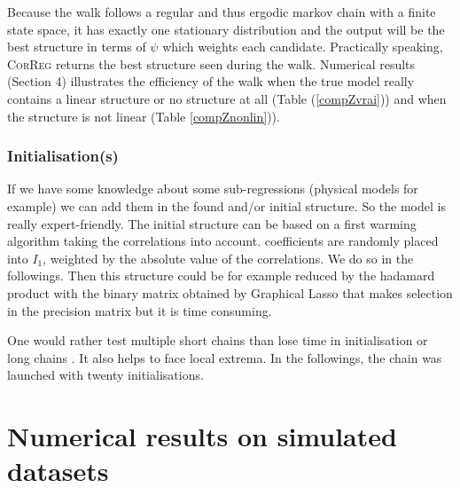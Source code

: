 \documentclass[11pt,a4paper]{article}
\begin{document}
Because the walk follows a regular and thus ergodic markov chain with a finite state space, it has exactly one stationary distribution \cite{grinstead1997introduction} %
%	
%	
%		
and the output will be the best structure in terms of $\psi$ which weights each candidate. Practically speaking, \textsc{CorReg} returns the best structure seen during the walk.
Numerical results (Section 4) illustrates the efficiency of the walk when the true model really contains a linear structure or no structure at all (Table (\ref{compZvrai})) and when the structure is not linear (Table \ref{compZnonlin})).

 \subsubsection{Initialisation(s)}

 If we have some knowledge about some sub-regressions (physical models for example) we can add them in the found and/or initial structure. So the model is really expert-friendly.
The initial structure can be based on a first warming algorithm taking the correlations into account. coefficients are randomly placed into $I_1$, weighted by the absolute value of the correlations. We do so in the followings. Then this structure could be for example reduced by the hadamard product with the binary matrix obtained by Graphical Lasso\cite{friedman2008sparse} that makes selection in the precision matrix but it is time consuming.

	One would rather test multiple short chains than lose time in initialisation or long chains \cite{gilks1996markov}. It also helps to face local extrema. In the followings, the chain was launched with twenty initialisations.
	
\section{Numerical results on simulated datasets} \label{sectionsimul}
\end{document}
